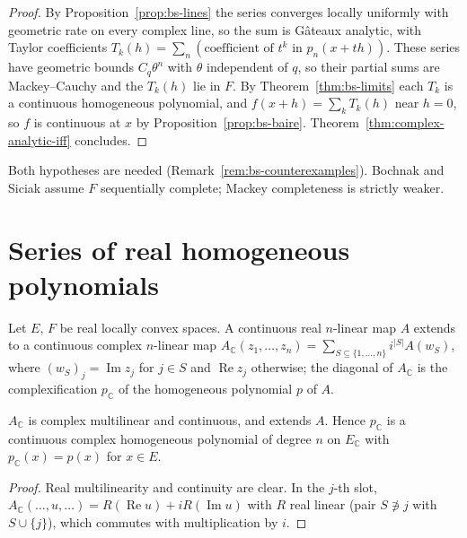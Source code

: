 \begin{proof}
  \leanok
  By Proposition~\ref{prop:bs-lines} the series converges locally uniformly with geometric rate
  on every complex line, so the sum is Gâteaux analytic, with Taylor coefficients
  $T_k(h) = \sum_n (\text{coefficient of } t^k \text{ in } p_n(x + th))$. These series have
  geometric bounds $C_q \theta^n$ with $\theta$ independent of $q$, so their partial sums are
  Mackey--Cauchy and the $T_k(h)$ lie in $F$. By Theorem~\ref{thm:bs-limits} each $T_k$ is a continuous homogeneous
  polynomial, and $f(x + h) = \sum_k T_k(h)$ near $h = 0$, so $f$ is continuous at $x$ by
  Proposition~\ref{prop:bs-baire}. Theorem~\ref{thm:complex-analytic-iff} concludes.
\end{proof}

Both hypotheses are needed (Remark~\ref{rem:bs-counterexamples}). Bochnak and Siciak assume
$F$ sequentially complete; Mackey completeness is strictly weaker.

\section{Series of real homogeneous polynomials}

Let $E$, $F$ be real locally convex spaces. A continuous real $n$-linear map $A$ extends to a
continuous complex $n$-linear map
$A_{\mathbb{C}}(z_1, \dots, z_n) = \sum_{S \subseteq \{1, \dots, n\}} i^{|S|} A(w_S)$, where
$(w_S)_j = \operatorname{Im} z_j$ for $j \in S$ and $\operatorname{Re} z_j$ otherwise; the
diagonal of $A_{\mathbb{C}}$ is the complexification $p_{\mathbb{C}}$ of the homogeneous
polynomial $p$ of $A$.

\begin{lemma}
  \label{lem:complexify-poly}
  \leanok
  $A_{\mathbb{C}}$ is complex multilinear and continuous, and extends $A$. Hence $p_{\mathbb{C}}$
  is a continuous complex homogeneous polynomial of degree $n$ on $E_{\mathbb{C}}$ with
  $p_{\mathbb{C}}(x) = p(x)$ for $x \in E$.
\end{lemma}

\begin{proof}
  \leanok
  Real multilinearity and continuity are clear. In the $j$-th slot,
  $A_{\mathbb{C}}(\dots, u, \dots) = R(\operatorname{Re} u) + i R(\operatorname{Im} u)$ with $R$ real
  linear (pair $S \not\ni j$ with $S \cup \{j\}$), which commutes with multiplication by $i$.
\end{proof}

